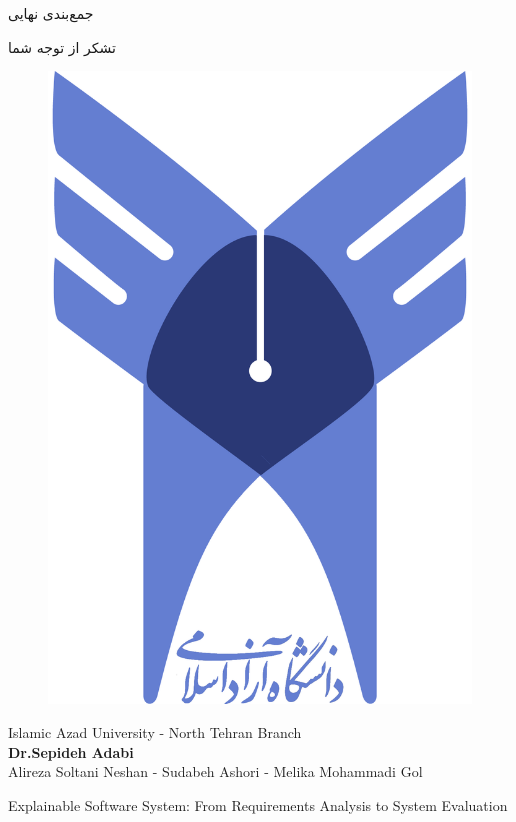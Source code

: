 \documentclass[10pt, a4paper]{beamer}
\begin{document}
\begin{frame}
    \centering
    جمع‌بندی نهایی
\end{frame}

\begin{frame}
    \centering
    تشکر از توجه شما
\end{frame}

\begin{frame}
    \centering
\begin{LTR}
        \centering
        \begin{figure}
            \includegraphics[scale=0.19]{images/iau_logo.png}
        \end{figure}

        \footnotesize{Islamic Azad University - North Tehran Branch} \\
        \textbf{\footnotesize Dr.Sepideh Adabi} \\
        \small{
            Alireza Soltani Neshan - 
            Sudabeh Ashori - 
            Melika Mohammadi Gol \\
        }
        \vspace{0.3in}

        \large{Explainable Software System: From Requirements Analysis to System
        Evaluation} \\
    \end{LTR}
\end{frame}
\end{document}
